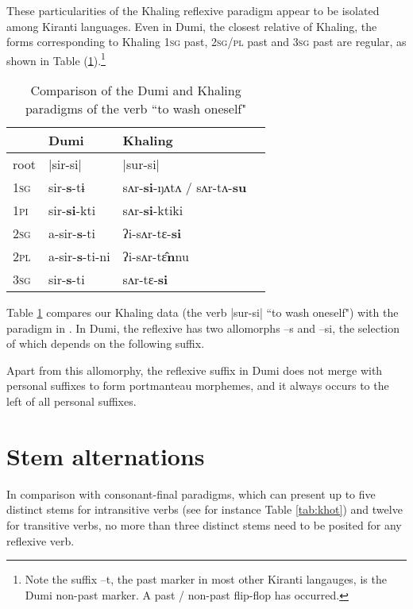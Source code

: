 \documentclass[twoside,a4paper,11pt]{article}
\newcommand{\ipa}[1]{{\phon#1}}
\begin{document}
These particularities of the Khaling reflexive paradigm appear to be isolated among Kiranti languages. Even in Dumi, the closest relative of Khaling, the forms corresponding to Khaling \textsc{1sg} past, \textsc{2sg/pl} past and \textsc{3sg} past are regular, as shown in Table (\ref{tab:dumi-khyal}).\footnote{Note the suffix --\ipa{t}, the past marker in most other Kiranti langauges, is the Dumi non-past marker. A past / non-past flip-flop has occurred. } 

\begin{table}[H] \centering
\caption{Comparison of the Dumi and Khaling paradigms of the verb ``to wash oneself"} \label{tab:dumi-khyal}
\begin{tabular}{llll}
\toprule
&	Dumi &	Khaling	\\
\midrule
root & |\ipa{sir-si}| & |\ipa{sur-si}|\\
\midrule
\textsc{1sg} &	\ipa{sir-\textbf{s}-tɨ} &	\ipa{sʌr-\textbf{si}-ŋʌtʌ / sʌr-tʌ-\textbf{su}} &	\\
\textsc{1pi} &	\ipa{sir-\textbf{si}-kti} &	\ipa{sʌr-\textbf{si}-ktiki} &	\\
\textsc{2sg} &	\ipa{a-sir-\textbf{s}-ti} &	\ipa{ʔi-sʌr-tɛ-\textbf{si}} &	\\
\textsc{2pl} &	\ipa{a-sir-\textbf{s}-ti-ni} &	\ipa{ʔi-sʌr-tɛ̂\textbf{n}nu} &	\\
\textsc{3sg} &	\ipa{sir-\textbf{s}-ti} &	\ipa{sʌr-tɛ-\textbf{si}} &	\\
\bottomrule
\end{tabular}
\end{table}


Table \ref{tab:dumi-khyal} compares our Khaling data (the verb |sur-si| ``to wash oneself") with the paradigm in \citet[125;362-3]{driem93dumi}. In Dumi, the reflexive has two allomorphs \ipa{--s} and \ipa{--si}, the selection of which depends on the following suffix. 

Apart from this allomorphy, the reflexive suffix in Dumi does not merge with personal suffixes to form portmanteau morphemes, and it always occurs to the left of all personal suffixes. 

 
 



\section{Stem alternations}
In comparison with consonant-final paradigms, which can present up to five distinct stems for intransitive verbs (see for instance Table \ref{tab:khot}) and twelve for transitive verbs, no more than three distinct stems need to be posited for any reflexive verb.
\end{document}
